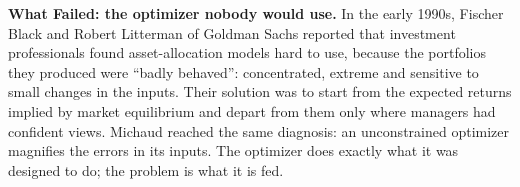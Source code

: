 \begin{callout}
\textbf{What Failed: the optimizer nobody would use.} In the early 1990s, Fischer Black and Robert Litterman of Goldman Sachs reported that investment professionals found asset-allocation models hard to use, because the portfolios they produced were ``badly behaved'': concentrated, extreme and sensitive to small changes in the inputs. Their solution was to start from the expected returns implied by market equilibrium and depart from them only where managers had confident views. Michaud reached the same diagnosis: an unconstrained optimizer magnifies the errors in its inputs. The optimizer does exactly what it was designed to do; the problem is what it is fed.
\end{callout}

